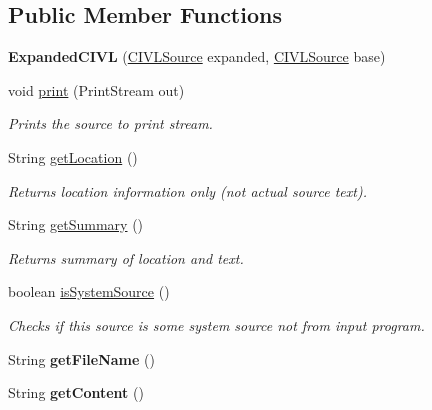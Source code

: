 \subsection*{Public Member Functions}
\begin{DoxyCompactItemize}
\item 
\hypertarget{classedu_1_1udel_1_1cis_1_1vsl_1_1civl_1_1model_1_1common_1_1ExpandedCIVL_a09b45d4f0ecc1cd7f33eb202d80e7606}{}{\bfseries Expanded\+C\+I\+V\+L} (\hyperlink{interfaceedu_1_1udel_1_1cis_1_1vsl_1_1civl_1_1model_1_1IF_1_1CIVLSource}{C\+I\+V\+L\+Source} expanded, \hyperlink{interfaceedu_1_1udel_1_1cis_1_1vsl_1_1civl_1_1model_1_1IF_1_1CIVLSource}{C\+I\+V\+L\+Source} base)\label{classedu_1_1udel_1_1cis_1_1vsl_1_1civl_1_1model_1_1common_1_1ExpandedCIVL_a09b45d4f0ecc1cd7f33eb202d80e7606}

\item 
void \hyperlink{classedu_1_1udel_1_1cis_1_1vsl_1_1civl_1_1model_1_1common_1_1ExpandedCIVL_a546258c682f00353cdbd7c93b5832d26}{print} (Print\+Stream out)
\begin{DoxyCompactList}\small\item\em Prints the source to print stream. \end{DoxyCompactList}\item 
String \hyperlink{classedu_1_1udel_1_1cis_1_1vsl_1_1civl_1_1model_1_1common_1_1ExpandedCIVL_ad54b7e48cea7ff30b00109b4c8c7f122}{get\+Location} ()
\begin{DoxyCompactList}\small\item\em Returns location information only (not actual source text). \end{DoxyCompactList}\item 
String \hyperlink{classedu_1_1udel_1_1cis_1_1vsl_1_1civl_1_1model_1_1common_1_1ExpandedCIVL_a1bcab4a686a7dc4e2cb6ddcec19ec103}{get\+Summary} ()
\begin{DoxyCompactList}\small\item\em Returns summary of location and text. \end{DoxyCompactList}\item 
boolean \hyperlink{classedu_1_1udel_1_1cis_1_1vsl_1_1civl_1_1model_1_1common_1_1ExpandedCIVL_a7ef267c9f7be910d141e06529bd08fa0}{is\+System\+Source} ()
\begin{DoxyCompactList}\small\item\em Checks if this source is some system source not from input program. \end{DoxyCompactList}\item 
\hypertarget{classedu_1_1udel_1_1cis_1_1vsl_1_1civl_1_1model_1_1common_1_1ExpandedCIVL_a18ec298d3bd26656c60e1151bf2a8e66}{}String {\bfseries get\+File\+Name} ()\label{classedu_1_1udel_1_1cis_1_1vsl_1_1civl_1_1model_1_1common_1_1ExpandedCIVL_a18ec298d3bd26656c60e1151bf2a8e66}

\item 
\hypertarget{classedu_1_1udel_1_1cis_1_1vsl_1_1civl_1_1model_1_1common_1_1ExpandedCIVL_ac9baecb7b27bf73f52c9e04e5138ca18}{}String {\bfseries get\+Content} ()\label{classedu_1_1udel_1_1cis_1_1vsl_1_1civl_1_1model_1_1common_1_1ExpandedCIVL_ac9baecb7b27bf73f52c9e04e5138ca18}

\end{DoxyCompactItemize}


